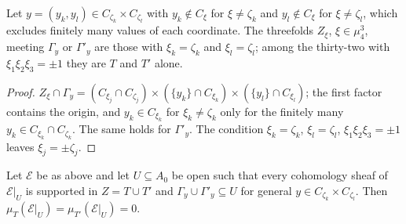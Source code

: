 \begin{lemma}\label{lem:curvesT}
Let $y=(y_{k},y_{l})\in C_{\zeta_{k}}\times C_{\zeta_{l}}$ with $y_{k}\notin C_{\xi}$ for $\xi\ne\zeta_{k}$ and $y_{l}\notin C_{\xi}$ for $\xi\ne\zeta_{l}$, which excludes finitely many values of each coordinate. The threefolds $Z_{\xi}$, $\xi\in\mu_{4}^{3}$, meeting $\Gamma_{y}$ or $\Gamma'_{y}$ are those with $\xi_{k}=\zeta_{k}$ and $\xi_{l}=\zeta_{l}$; among the thirty-two with $\xi_{1}\xi_{2}\xi_{3}=\pm1$ they are $T$ and $T'$ alone.
\end{lemma}

\begin{proof}
$Z_{\xi}\cap\Gamma_{y}=(C_{\xi_{j}}\cap C_{\zeta_{j}})\times(\{y_{k}\}\cap C_{\xi_{k}})\times(\{y_{l}\}\cap C_{\xi_{l}})$; the first factor contains the origin, and $y_{k}\in C_{\xi_{k}}$ for $\xi_{k}\ne\zeta_{k}$ only for the finitely many $y_{k}\in C_{\xi_{k}}\cap C_{\zeta_{k}}$. The same holds for $\Gamma'_{y}$. The condition $\xi_{k}=\zeta_{k}$, $\xi_{l}=\zeta_{l}$, $\xi_{1}\xi_{2}\xi_{3}=\pm1$ leaves $\xi_{j}=\pm\zeta_{j}$.
\end{proof}

\begin{theorem}\label{thm:pair}
Let $\mathcal{E}$ be as above and let $U\subseteq A_{0}$ be open such that every cohomology sheaf of $\mathcal{E}|_{U}$ is supported in $Z=T\cup T'$ and $\Gamma_{y}\cup\Gamma'_{y}\subseteq U$ for general $y\in C_{\zeta_{k}}\times C_{\zeta_{l}}$. Then $\mu_{T}(\mathcal{E}|_{U})=\mu_{T'}(\mathcal{E}|_{U})=0$.
\end{theorem}

